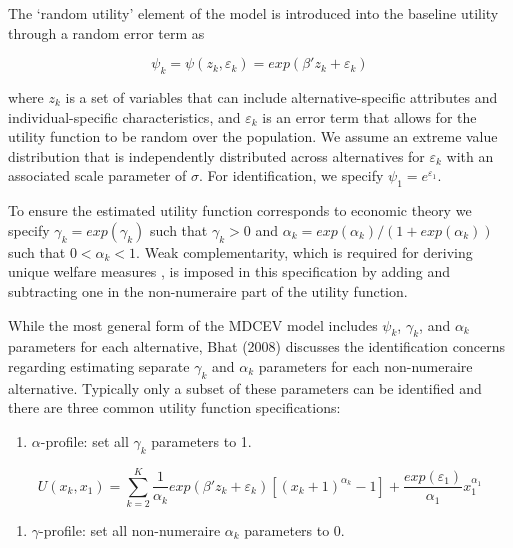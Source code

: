 The `random utility' element of the model is introduced into the
baseline utility through a random error term as

\begin{equation}
\label{eq:psi}
\psi_k=\psi(z_k,\varepsilon_k)= exp(\beta'z_k+\varepsilon_k)
\end{equation}

\noindent where \(z_k\) is a set of variables that can include
alternative-specific attributes and individual-specific characteristics,
and \(\varepsilon_k\) is an error term that allows for the utility
function to be random over the population. We assume an extreme value
distribution that is independently distributed across alternatives for
\(\varepsilon_k\) with an associated scale parameter of \(\sigma\). For
identification, we specify \(\psi_1= e^{\varepsilon_1}\).

To ensure the estimated utility function corresponds to economic theory
we specify \(\gamma_k = exp(\gamma_k)\) such that \(\gamma_k > 0\) and
\(\alpha_k = exp(\alpha_k)/(1 + exp(\alpha_k))\) such that
\(0 < \alpha_k < 1\). Weak complementarity, which is required for
deriving unique welfare measures \citep{malerenvironment1974}, is
imposed in this specification by adding and subtracting one in the
non-numeraire part of the utility function.

While the most general form of the MDCEV model includes \(\psi_k\),
\(\gamma_k\), and \(\alpha_k\) parameters for each alternative, Bhat
(2008) discusses the identification concerns regarding estimating
separate \(\gamma_k\) and \(\alpha_k\) parameters for each non-numeraire
alternative. Typically only a subset of these parameters can be
identified and there are three common utility function specifications:

\begin{enumerate}
\def\labelenumi{\arabic{enumi}.}
\tightlist
\item
  \(\alpha\)-profile: set all \(\gamma_k\) parameters to 1.
\end{enumerate}

\begin{equation}
\label{eq:alpha}
U(x_k, x_1) = \sum_{k=2}^{K} \frac{1}{\alpha_k}exp(\beta'z_k+\varepsilon_k) \left[ \left( x_k + 1 \right)^{\alpha_k} - 1 \right] + \frac{exp(\varepsilon_1)}{\alpha_1}x_1^{\alpha_1}
\end{equation}

\begin{enumerate}
\def\labelenumi{\arabic{enumi}.}
\setcounter{enumi}{1}
\tightlist
\item
  \(\gamma\)-profile: set all non-numeraire \(\alpha_k\) parameters to
  0.
\end{enumerate}

